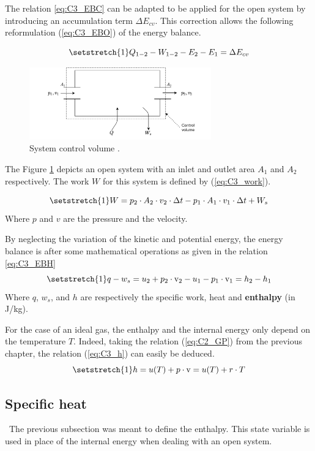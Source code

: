 The relation \ref{eq:C3_EBC} can be adapted to be applied for the open system by introducing an accumulation term $\Delta E_{cv}$. This correction allows the following reformulation (\ref{eq:C3_EBO}) of the energy balance.

\begin{equation}
\setstretch{1}
Q_{1-2} - W_{1-2} - E_{2} - E_{1} = \Delta E_{cv}\label{eq:C3_EBO}
\end{equation}
\begin{figure}[h]
\centering
\includegraphics[width=0.7\textwidth]{control_volume.png}
\caption{System control volume \cite{Dewallef2019}.}
\label{fig:C3_VC}
\end{figure}
The Figure \ref{fig:C3_VC} depicts an open system with an inlet and outlet area $A_1$ and $A_2$ respectively. The work $W$ for this system is defined by (\ref{eq:C3_work}).

\begin{equation}
\setstretch{1}
W = p_2\cdot A_2\cdot v_2\cdot \Delta t - p_1\cdot A_1\cdot v_1\cdot \Delta t + W_s \label{eq:C3_work}
\end{equation}      
Where $p$ and $v$ are the pressure and the velocity.

By neglecting the variation of the kinetic and potential energy, the energy balance is after some mathematical operations as given in the relation \ref{eq:C3_EBH}
\begin{equation}
\setstretch{1}
q - w_s = u_2 +p_2\cdot \mathrm{v}_2 - u_1 - p_1\cdot \mathrm{v}_1 = h_2 - h_1\label{eq:C3_EBH}
\end{equation}
Where $q$, $w_s$, and $h$ are respectively the specific work, heat and \textbf{enthalpy} (in J/kg).  

For the case of an ideal gas, the enthalpy and the internal energy only depend on the temperature $T$. Indeed, taking the relation (\ref{eq:C2_GP}) from the previous chapter, the relation (\ref{eq:C3_h}) can easily be deduced.
\begin{equation}
\setstretch{1}
h = u(T) + p\cdot \mathrm{v} = u(T) + r\cdot T \label{eq:C3_h}
\end{equation}
\subsection{Specific heat}
\quad\ The previous subsection was meant to define the enthalpy. This state variable is used in place of the internal energy when dealing with an open system.

